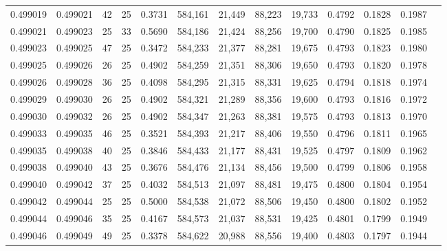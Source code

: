 \begin{tabular}{rrrrrrrrrrrrr}
0.499019 & 0.499021 &    42 &  25 &                                     0.3731 & 584,161 &  21,449 &  88,223 &  19,733 & 0.4792 & 0.1828 & 0.1987 \\
0.499021 & 0.499023 &    25 &  33 &                                     0.5690 & 584,186 &  21,424 &  88,256 &  19,700 & 0.4790 & 0.1825 & 0.1985 \\
0.499023 & 0.499025 &    47 &  25 &                                     0.3472 & 584,233 &  21,377 &  88,281 &  19,675 & 0.4793 & 0.1823 & 0.1980 \\
0.499025 & 0.499026 &    26 &  25 &                                     0.4902 & 584,259 &  21,351 &  88,306 &  19,650 & 0.4793 & 0.1820 & 0.1978 \\
0.499026 & 0.499028 &    36 &  25 &                                     0.4098 & 584,295 &  21,315 &  88,331 &  19,625 & 0.4794 & 0.1818 & 0.1974 \\
0.499029 & 0.499030 &    26 &  25 &                                     0.4902 & 584,321 &  21,289 &  88,356 &  19,600 & 0.4793 & 0.1816 & 0.1972 \\
0.499030 & 0.499032 &    26 &  25 &                                     0.4902 & 584,347 &  21,263 &  88,381 &  19,575 & 0.4793 & 0.1813 & 0.1970 \\
0.499033 & 0.499035 &    46 &  25 &                                     0.3521 & 584,393 &  21,217 &  88,406 &  19,550 & 0.4796 & 0.1811 & 0.1965 \\
0.499035 & 0.499038 &    40 &  25 &                                     0.3846 & 584,433 &  21,177 &  88,431 &  19,525 & 0.4797 & 0.1809 & 0.1962 \\
0.499038 & 0.499040 &    43 &  25 &                                     0.3676 & 584,476 &  21,134 &  88,456 &  19,500 & 0.4799 & 0.1806 & 0.1958 \\
0.499040 & 0.499042 &    37 &  25 &                                     0.4032 & 584,513 &  21,097 &  88,481 &  19,475 & 0.4800 & 0.1804 & 0.1954 \\
0.499042 & 0.499044 &    25 &  25 &                                     0.5000 & 584,538 &  21,072 &  88,506 &  19,450 & 0.4800 & 0.1802 & 0.1952 \\
0.499044 & 0.499046 &    35 &  25 &                                     0.4167 & 584,573 &  21,037 &  88,531 &  19,425 & 0.4801 & 0.1799 & 0.1949 \\
0.499046 & 0.499049 &    49 &  25 &                                     0.3378 & 584,622 &  20,988 &  88,556 &  19,400 & 0.4803 & 0.1797 & 0.1944 \\

\end{tabular}
